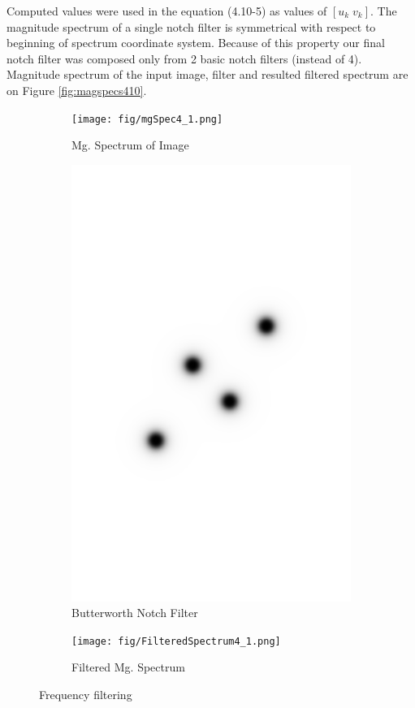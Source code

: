 \documentclass[11pt]{article}
\numberwithin{equation}{section}
\begin{document}
Computed values were used in the equation (4.10-5) as values of $\left[u_k\; v_k\right]$. The magnitude spectrum of a single notch filter is symmetrical with respect to beginning of spectrum coordinate system. Because of this property our final notch filter was composed only from 2 basic notch filters (instead of 4). Magnitude spectrum of the input image, filter and resulted filtered spectrum are on Figure \ref{fig:magspecs410}.

\begin{figure}[h]
	\centering
	\begin{subfigure}[b]{0.3\textwidth}
		\texttt{[image: fig/mgSpec4\_1.png]}
		\caption{Mg. Spectrum of Image}
		\label{fig:imgMagSpec41}
	\end{subfigure} \quad
	\begin{subfigure}[b]{0.3\textwidth}
		\includegraphics[width=\textwidth]{fig/notchRF4_1.png}
		\caption{Butterworth Notch Filter}
		\label{fig:buttnotchfilter41}
	\end{subfigure}\quad
	\begin{subfigure}[b]{0.3\textwidth}
		\texttt{[image: fig/FilteredSpectrum4\_1.png]}
		\caption{Filtered Mg. Spectrum}
		\label{fig:filteredMgSpectrum41}
	\end{subfigure}
	\caption{Frequency filtering}
	\label{fig:magspecs41}
\end{figure}
\end{document}
